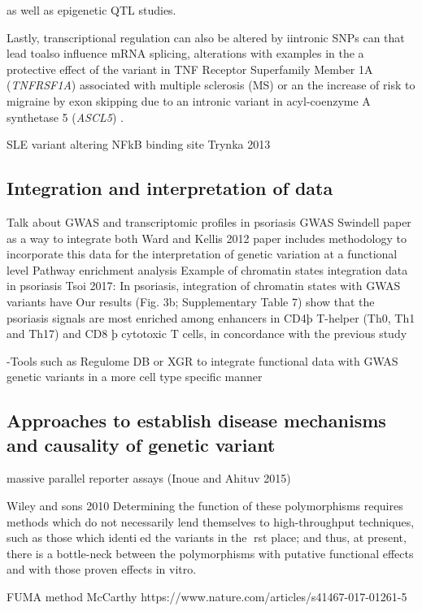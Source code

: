 as well as epigenetic QTL studies. 

 Lastly, transcriptional regulation can also be altered by iintronic SNPs can that lead toalso influence mRNA splicing, alterations with examples in the a protective effect of the variant in TNF Receptor Superfamily Member 1A (\textit{TNFRSF1A}) associated with multiple sclerosis (MS) \parencite{Gregory2012}  or an the increase of risk to migraine by exon skipping due to an intronic variant in acyl-coenzyme A synthetase 5 (\textit{ASCL5}) \parencite{Matesanz2016}.

SLE variant altering NFkB binding site Trynka 2013

\subsection{Integration and interpretation of data}
Talk about GWAS and transcriptomic profiles in psoriasis GWAS Swindell paper as a way to integrate both
Ward and Kellis 2012 paper includes methodology to incorporate this data for the interpretation of genetic variation at a functional level
Pathway enrichment analysis
Example of chromatin states integration data in psoriasis Tsoi 2017: In psoriasis, integration of chromatin states with GWAS variants have
Our   results   (Fig.   3b;   Supplementary   Table   7)   show   that   the
 psoriasis signals are most enriched among enhancers in CD4þ T-helper (Th0, Th1 and Th17) and CD8 þ   cytotoxic T cells, in
 concordance with the previous study



-Tools such as Regulome DB or XGR to integrate functional data with GWAS genetic variants in a more cell type specific manner


\subsection{Approaches to establish disease mechanisms and causality of genetic variant}
massive parallel reporter assays (Inoue and Ahituv 2015)

Wiley and sons 2010
Determining the function of these polymorphisms requires methods which do not   necessarily   lend   themselves   to   high-throughput techniques, such as those which identied the variants in the rst place; and thus, at present, there is a bottle-neck between the polymorphisms with putative functional effects and with those proven effects in vitro.


FUMA method McCarthy
https://www.nature.com/articles/s41467-017-01261-5







